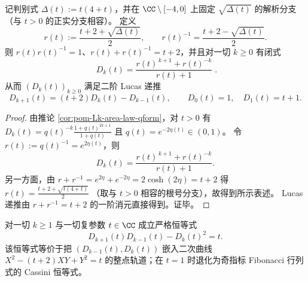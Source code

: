 \begin{corollary}\label{cor:pom-Lk-det-lucas-unit}
记判别式 \(\Delta(t):=t(4+t)\)，并在 \(\CC\setminus[-4,0]\) 上固定 \(\sqrt{\Delta(t)}\) 的解析分支（与 \(t>0\) 的正实分支相容）。
定义
\[
r(t):=\frac{t+2+\sqrt{\Delta(t)}}{2},
\qquad
r(t)^{-1}=\frac{t+2-\sqrt{\Delta(t)}}{2}.
\]
则 \(r(t)r(t)^{-1}=1\)、\(r(t)+r(t)^{-1}=t+2\)，并且对一切 \(k\ge 0\) 有闭式
\[
\boxed{\;
D_k(t)=\frac{r(t)^{\,k+1}+r(t)^{-k}}{r(t)+1}\; }.
\]
从而 \((D_k(t))_{k\ge 0}\) 满足二阶 Lucas 递推
\[
D_{k+1}(t)=(t+2)D_k(t)-D_{k-1}(t),
\qquad
D_0(t)=1,\quad D_1(t)=t+1.
\]
\end{corollary}

\begin{proof}
由推论 \ref{cor:pom-Lk-area-law-qform}，对 \(t>0\) 有
\(
D_k(t)=q(t)^{-k}\frac{1+q(t)^{2k+1}}{1+q(t)}
\)
且 \(q(t)=e^{-2\eta(t)}\in(0,1)\)。
令 \(r(t):=q(t)^{-1}=e^{2\eta(t)}\)，则
\[
D_k(t)=\frac{r(t)^{\,k+1}+r(t)^{-k}}{r(t)+1}.
\]
另一方面，由 \(r+r^{-1}=e^{2\eta}+e^{-2\eta}=2\cosh(2\eta)=t+2\) 得
\(
r(t)=\frac{t+2+\sqrt{t(4+t)}}{2}
\)
（取与 \(t>0\) 相容的根号分支），故得到所示表述。
Lucas 递推由 \(r+r^{-1}=t+2\) 的一阶消元直接得到。证毕。
\end{proof}

\begin{proposition}\label{prop:pom-Lk-det-cassini-pell}
对一切 \(k\ge 1\) 与一切复参数 \(t\in\CC\) 成立严格恒等式
\[
\boxed{\;
D_{k+1}(t)D_{k-1}(t)-D_k(t)^2=t.\;}
\]
该恒等式等价于把 \((D_{k-1}(t),D_k(t))\) 嵌入二次曲线
\(
X^2-(t+2)XY+Y^2=t
\)
的整点轨道；在 \(t=1\) 时退化为奇指标 Fibonacci 行列式的 Cassini 恒等式。
\end{proposition}

